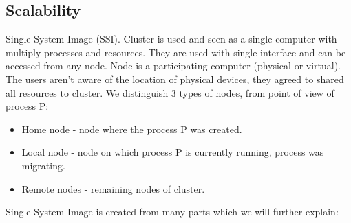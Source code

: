 \documentclass[12pt]{report}
\begin{document}
\subsection{Scalability}
Single-System Image (SSI). Cluster is used and seen as a single computer with multiply processes and resources. They are used with single interface and can be accessed from any node. Node is a participating computer (physical or virtual). The users aren't aware of the location of physical devices, they agreed to shared all resources to cluster.
We distinguish 3 types of nodes, from point of view of process P:
\begin{itemize}
\item Home node - node where the process P was created.
\item Local node - node on which process P is currently running, process was migrating.
\item Remote nodes - remaining nodes of cluster.
\end{itemize}
Single-System Image is created from many parts which we will further explain:
\end{document}
